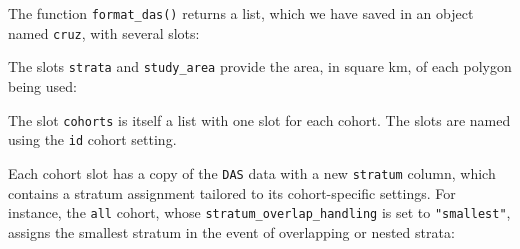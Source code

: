 \documentclass[
]{book}
\newenvironment{Shaded}{\begin{snugshade}}{\end{snugshade}}
\newcommand{\DecValTok}[1]{\textcolor[rgb]{0.00,0.00,0.81}{#1}}
\newcommand{\FloatTok}[1]{\textcolor[rgb]{0.00,0.00,0.81}{#1}}
\newcommand{\NormalTok}[1]{#1}
\newcommand{\OperatorTok}[1]{\textcolor[rgb]{0.81,0.36,0.00}{\textbf{#1}}}
\newcommand{\StringTok}[1]{\textcolor[rgb]{0.31,0.60,0.02}{#1}}
\begin{document}
The function \texttt{format\_das()} returns a list, which we have saved in an object named \texttt{cruz}, with several slots:

\begin{Shaded}
\end{Shaded}

The slots \texttt{strata} and \texttt{study\_area} provide the area, in square km, of each polygon being used:

\begin{Shaded}
\end{Shaded}

The slot \texttt{cohorts} is itself a list with one slot for each cohort. The slots are named using the \texttt{id} cohort setting.

\begin{Shaded}
\end{Shaded}

Each cohort slot has a copy of the \texttt{DAS} data with a new \texttt{stratum} column, which contains a stratum assignment tailored to its cohort-specific settings. For instance, the \texttt{all} cohort, whose \texttt{stratum\_overlap\_handling} is set to \texttt{"smallest"}, assigns the smallest stratum in the event of overlapping or nested strata:
\end{document}
